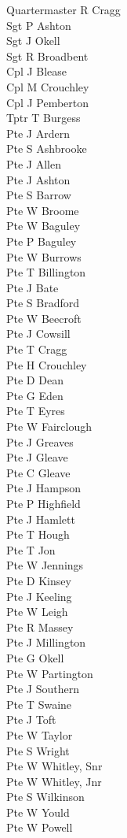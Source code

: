\begin{multicols}{3}
  \small
  \noindent
  Quartermaster R Cragg \\
  Sgt P Ashton \\
  Sgt J Okell \\
  Sgt R Broadbent \\
  Cpl J Blease \\
  Cpl M Crouchley \\
  Cpl J Pemberton \\
  Tptr T Burgess \\
  Pte J Ardern \\
  Pte S Ashbrooke \\
  Pte J Allen \\
  Pte J Ashton \\
  Pte S Barrow \\
  Pte W Broome \\
  Pte W Baguley \\
  Pte P Baguley \\
  Pte W Burrows \\
  Pte T Billington \\
  Pte J Bate \\
  Pte S Bradford \\
  Pte W Beecroft \\
  Pte J Cowsill \\
  Pte T Cragg \\
  Pte H Crouchley \\
  Pte D Dean \\
  Pte G Eden \\
  Pte T Eyres \\
  Pte W Fairclough \\
  Pte J Greaves \\
  Pte J Gleave \\
  Pte C Gleave \\
  Pte J Hampson \\
  Pte P Highfield \\
  Pte J Hamlett \\
  Pte T Hough \\
  Pte T Jon \\
  Pte W Jennings \\
  Pte D Kinsey \\
  Pte J Keeling \\
  Pte W Leigh \\
  Pte R Massey \\
  Pte J Millington \\
  Pte G Okell \\
  Pte W Partington \\
  Pte J Southern \\
  Pte T Swaine \\
  Pte J Toft \\
  Pte W Taylor \\
  Pte S Wright \\
  Pte W Whitley, Snr \\
  Pte W Whitley, Jnr \\
  Pte S Wilkinson \\
  Pte W Yould \\
  Pte W Powell \\
\end{multicols}

